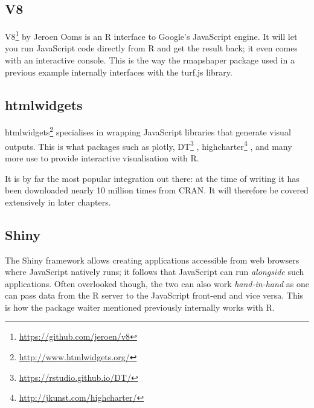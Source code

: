 \documentclass[10pt,]{krantz}
\makeatletter
\newenvironment{Shaded}{\begin{snugshade}}{\end{snugshade}}
\newcommand{\CommentTok}[1]{\textcolor[rgb]{0.37,0.37,0.37}{\textit{#1}}}
\newcommand{\KeywordTok}[1]{\textcolor[rgb]{0.27,0.27,0.27}{\textbf{#1}}}
\newcommand{\NormalTok}[1]{#1}
\newcommand{\OperatorTok}[1]{\textcolor[rgb]{0.43,0.43,0.43}{\textbf{#1}}}
\newcommand{\StringTok}[1]{\textcolor[rgb]{0.5,0.5,0.5}{#1}}
\renewcommand{\href}[2]{#2\footnote{\url{#1}}}
\newenvironment{kframe}{%
\medskip{}
\setlength{\fboxsep}{.8em}
 \def\at@end@of@kframe{}%
 \ifinner\ifhmode%
  \def\at@end@of@kframe{\end{minipage}}%
  \begin{minipage}{\columnwidth}%
 \fi\fi%
 \def\FrameCommand##1{\hskip\@totalleftmargin \hskip-\fboxsep
 \colorbox{shadecolor}{##1}\hskip-\fboxsep
     \hskip-\linewidth \hskip-\@totalleftmargin \hskip\columnwidth}%
 \MakeFramed {\advance\hsize-\width
   \@totalleftmargin\z@ \linewidth\hsize
   \@setminipage}}%
 {\par\unskip\endMakeFramed%
 \at@end@of@kframe}
\renewenvironment{Shaded}{\begin{kframe}}{\end{kframe}}
\makeatother
\begin{document}
\hypertarget{intro-v8}{%
\subsection{V8}\label{intro-v8}}

\href{https://github.com/jeroen/v8}{V8} by Jeroen Ooms is an R interface to Google's JavaScript engine. It will let you run JavaScript code directly from R and get the result back; it even comes with an interactive console. This is the way the rmapshaper package used in a previous example internally interfaces with the turf.js library.

\begin{Shaded}
\end{Shaded}

\hypertarget{intro-htmlwidgets}{%
\subsection{htmlwidgets}\label{intro-htmlwidgets}}

\href{http://www.htmlwidgets.org/}{htmlwidgets} \citep{R-htmlwidgets} specialises in wrapping JavaScript libraries that generate visual outputs. This is what packages such as plotly, \href{https://rstudio.github.io/DT/}{DT} \citep{R-DT}, \href{http://jkunst.com/highcharter/}{highcharter} \citep{R-highcharter}, and many more use to provide interactive visualisation with R.

It is by far the most popular integration out there: at the time of writing it has been downloaded nearly 10 million times from CRAN. It will therefore be covered extensively in later chapters.

\hypertarget{intro-shiny}{%
\subsection{Shiny}\label{intro-shiny}}

The Shiny framework allows creating applications accessible from web browsers where JavaScript natively runs; it follows that JavaScript can run \emph{alongside} such applications. Often overlooked though, the two can also work \emph{hand-in-hand} as one can pass data from the R server to the JavaScript front-end and vice versa. This is how the package waiter mentioned previously internally works with R.
\end{document}
